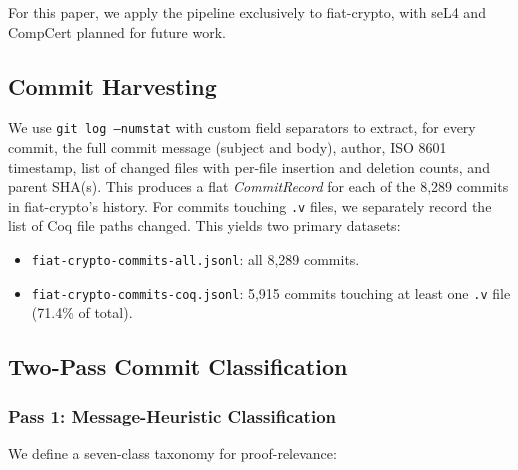 \documentclass[11pt]{article}
\begin{document}
For this paper, we apply the pipeline exclusively to fiat-crypto, with seL4 and CompCert planned for future work.

\subsection{Commit Harvesting}

We use \texttt{git log --numstat} with custom field separators to extract, for every commit, the full commit message (subject and body), author, ISO 8601 timestamp, list of changed files with per-file insertion and deletion counts, and parent SHA(s). This produces a flat \textit{CommitRecord} for each of the 8,289 commits in fiat-crypto's history. For commits touching \texttt{.v} files, we separately record the list of Coq file paths changed. This yields two primary datasets:

\begin{itemize}
  \item \texttt{fiat-crypto-commits-all.jsonl}: all 8,289 commits.
  \item \texttt{fiat-crypto-commits-coq.jsonl}: 5,915 commits touching at least one \texttt{.v} file (71.4\% of total).
\end{itemize}

\subsection{Two-Pass Commit Classification}

\subsubsection{Pass 1: Message-Heuristic Classification}

We define a seven-class taxonomy for proof-relevance:
\end{document}
